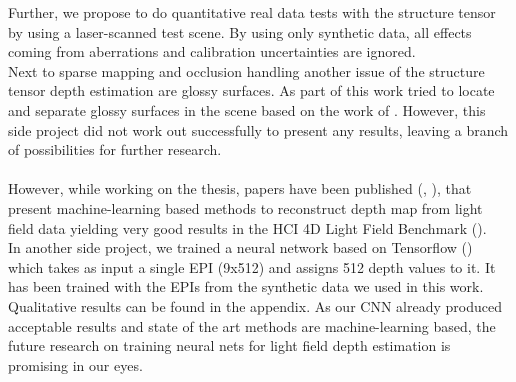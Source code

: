 \documentclass  [
  paper    = a4,
  BCOR     = 10mm,
  twoside,
  fontsize = 12pt,
  fleqn,
  toc      = bibnumbered,
  toc      = listofnumbered,
  numbers  = noendperiod,
  headings = normal,
  listof   = leveldown,
  version  = 3.03
]                                       {scrreprt}
\begin{document}
Further, we propose to do quantitative real data tests with the structure tensor by using a laser-scanned test scene. By using only synthetic data, all effects coming from aberrations and calibration uncertainties are ignored.\\
Next to sparse mapping and occlusion handling another issue of the structure tensor depth estimation are glossy surfaces. As part of this work tried to locate and separate glossy surfaces in the scene based on the work of \cite{tao2017shape}. However, this side project did not work out successfully to present any results, leaving a branch of possibilities for further research.\\
\\ 
However, while working on the thesis, papers have been published (\cite{luo2017epi}, \cite{shin18epinet}), that present machine-learning based methods to reconstruct depth map from light field data yielding very good results in the HCI 4D Light Field Benchmark (\cite{hci_benchmark}).\\
In another side project, we trained a neural network based on Tensorflow (\cite{tensorflow2015-whitepaper}) which takes as input a single EPI (9x512) and assigns 512 depth values to it. It has been trained with the EPIs from the synthetic data we used in this work. Qualitative results can be found in the appendix. As our CNN already produced acceptable results and state of the art methods are machine-learning based, the future research on training neural nets for light field depth estimation is promising in our eyes.
\end{document}
